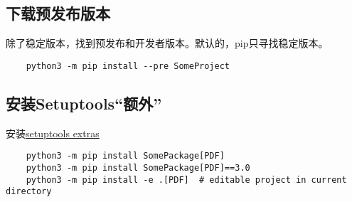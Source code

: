 \documentclass[../package_tutorial.tex]{subfiles}
\begin{document}
\subsection{下载预发布版本}

除了稳定版本，找到预发布和开发者版本。默认的，pip只寻找稳定版本。

\begin{lstlisting}
    python3 -m pip install --pre SomeProject
\end{lstlisting}

\subsection{安装Setuptools“额外”}

安装\href{https://setuptools.readthedocs.io/en/latest/userguide/dependency_management.html#optional-dependencies}{setuptools extras}

\begin{lstlisting}
    python3 -m pip install SomePackage[PDF]
    python3 -m pip install SomePackage[PDF]==3.0
    python3 -m pip install -e .[PDF]  # editable project in current directory
\end{lstlisting}
\end{document}
